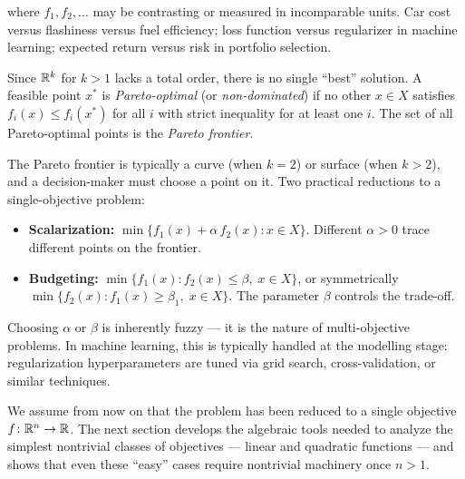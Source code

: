 where $f_1, f_2, \dots$ may be contrasting or measured in incomparable units.
Car cost versus flashiness versus fuel efficiency; loss function versus regularizer in machine learning; expected return versus risk in portfolio selection.

\begin{defn}\label{def:pareto}
	Since $\mathbb{R}^k$ for $k > 1$ lacks a total order, there is no single ``best'' solution.
	A feasible point $x^*$ is \textit{Pareto-optimal} (or \textit{non-dominated}) if no other $x \in X$ satisfies
	$f_i(x) \leq f_i(x^*)$ for all $i$ with strict inequality for at least one $i$.
	The set of all Pareto-optimal points is the \textit{Pareto frontier}.
\end{defn}

The Pareto frontier is typically a curve (when $k = 2$) or surface (when $k > 2$), and a decision-maker must choose a point on it.
Two practical reductions to a single-objective problem:
\begin{itemize}
	\item \textbf{Scalarization:} $\min\{f_1(x) + \alpha\, f_2(x) : x \in X\}$.
		Different $\alpha > 0$ trace different points on the frontier.
	\item \textbf{Budgeting:} $\min\{f_1(x) : f_2(x) \leq \beta,\; x \in X\}$, or symmetrically $\min\{f_2(x) : f_1(x) \geq \beta_1,\; x \in X\}$.
		The parameter $\beta$ controls the trade-off.
\end{itemize}
Choosing $\alpha$ or $\beta$ is inherently fuzzy --- it is the nature of multi-objective problems.
In machine learning, this is typically handled at the modelling stage: regularization hyperparameters are tuned via grid search, cross-validation, or similar techniques.

We assume from now on that the problem has been reduced to a single objective $f \colon \mathbb{R}^n \to \mathbb{R}$.
The next section develops the algebraic tools needed to analyze the simplest nontrivial classes of objectives --- linear and quadratic functions --- and shows that even these ``easy'' cases require nontrivial machinery once $n > 1$.